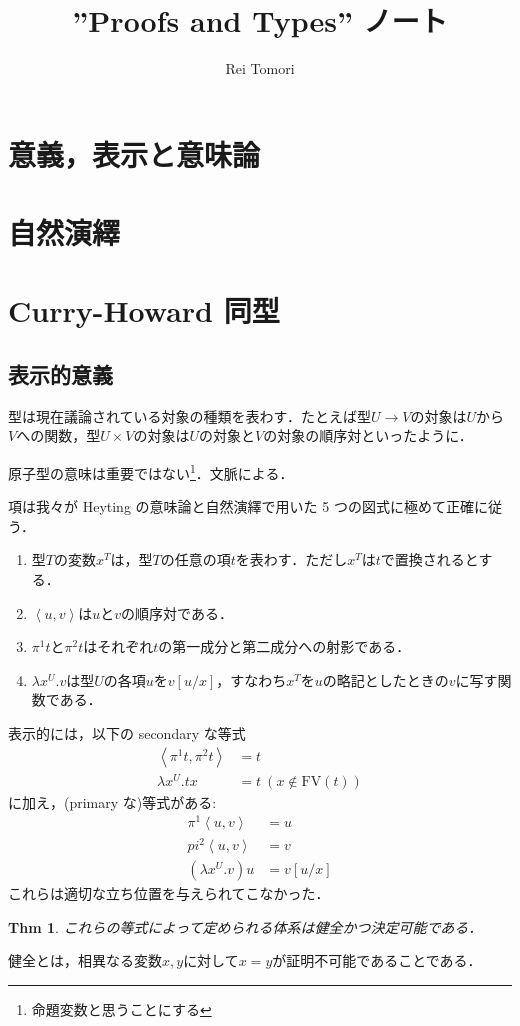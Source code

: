 \documentclass[a4paper,10pt,platex, dvipdfmx]{jsarticle}
\title{''Proofs and Types'' ノート}
\author{Rei Tomori}
\newtheorem{thm}{Thm}
\begin{document}
\maketitle
\section{意義，表示と意味論}
\section{自然演繹}
\section{Curry-Howard 同型}
\subsection{表示的意義}
型は現在議論されている対象の種類を表わす．たとえば型$U \to V$の対象は$U$から$V$への関数，型$U\times V$の対象は$U$の対象と$V$の対象の順序対といったように．

原子型の意味は重要ではない\footnote{命題変数と思うことにする}．文脈による．

項は我々が Heyting の意味論と自然演繹で用いた 5 つの図式に極めて正確に従う．\begin{enumerate}
\item 型$T$の変数$x^{T}$は，型$T$の任意の項$t$を表わす．ただし$x^{T}$は$t$で置換されるとする．
\item $\left<u, v\right>$は$u$と$v$の順序対である．
\item $\pi^{1}t$と$\pi^{2}t$はそれぞれ$t$の第一成分と第二成分への射影である．
\item $\lambda x^{U}. v$は型$U$の各項$u$を$v\left[u/ x\right]$，すなわち$x^{T}$を$u$の略記としたときの$v$に写す関数である．
\end{enumerate}
表示的には，以下の secondary な等式
\begin{align}
\nonumber
\left<\pi^{1}t, \pi^{2}t\right> &= t\\
\nonumber
\lambda x^{U} . t x & = t\ (x\notin\mathrm{FV}(t))
\end{align}に加え，(primary な)等式がある:\begin{align}
    \nonumber
\pi^{1}\left<u, v\right> &= u\\
\label{eqn:1}
pi^{2}\left<u, v\right> &= v\\
\nonumber
(\lambda x^{U}. v) u &= v\left[u/x\right]
\end{align}
これらは適切な立ち位置を与えられてこなかった．
\begin{thm}
    これらの等式によって定められる体系は健全かつ決定可能である．
\end{thm}
健全とは，相異なる変数$x, y$に対して$x = y$が証明不可能であることである．
\end{document}
